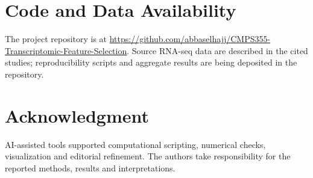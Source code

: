 \documentclass[conference,a4paper]{IEEEtran}
\begin{document}
\section*{Code and Data Availability}
The project repository is at \url{https://github.com/abbaselhajj/CMPS355-Transcriptomic-Feature-Selection}. Source RNA-seq data are described in the cited studies; reproducibility scripts and aggregate results are being deposited in the repository.

\section*{Acknowledgment}
AI-assisted tools supported computational scripting, numerical checks, visualization and editorial refinement. The authors take responsibility for the reported methods, results and interpretations.



\end{document}
